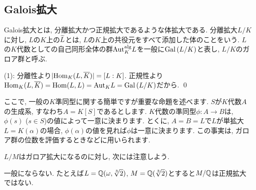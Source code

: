 \subsection{Galois拡大}
Galois拡大とは, 分離拡大かつ正規拡大であるような体拡大である. 分離拡大$L/K$に対し, $L$の$K$上の$\widetilde{L}$とは, $L$の$K$上の共役元をすべて添加した体のことをいう. $L$の$K$代数としての自己同形全体の群$\mathrm{Aut}_{K}^{\mathrm{alg}}L$を一般に$\operatorname{Gal}{(L/K)}$と表し, $L/K$のガロア群と呼ぶ. \par
{}
\prf
(1): 分離性より$|\mathrm{Hom}_{K}(L,\overline{K})| = [L:K]$. 正規性より$\mathrm{Hom}_{K}(L,\overline{K}) = \mathrm{Hom}(L,L) = \mathrm{Aut}_{K}L = \operatorname{Gal}{(L/K)}$だから.
\qed

\begin{rem} ここで, 一般の$K$準同型に関する簡単ですが重要な命題を述べます. $S$が$K$代数$A$の生成系, すなわち$A=K[S]$であるとします. $K$代数の準同型$\phi:A\to B$は, $\phi(s)$ ($s\in S$)の値によって一意に決まります. とくに, $A=B=L$で$L$が単拡大$L=K(\alpha)$の場合, $\phi(\alpha)$の値を見れば$\phi$は一意に決まります. この事実は, ガロア群の位数を評価するときなどに用いられます.
\end{rem}

$L/M$はガロア拡大になるのに対し, 次には注意しよう.
\begin{egans}
一般にならない. たとえば$L=\mathbb{Q}(\omega,\sqrt[3]{2})$, $M=\mathbb{Q}(\sqrt[3]{2})$とすると$M/\mathbb{Q}$は正規拡大ではない.
\end{egans}



